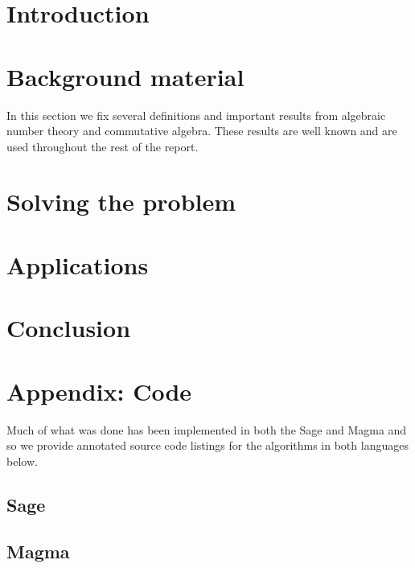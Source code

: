 \documentclass[11pt,a4paper]{report}
\theoremstyle{definition}
\begin{document}
\maketitle
\tableofcontents


\chapter{Introduction}

\chapter{Background material}
In this section we fix several definitions and important results from algebraic number theory and commutative algebra.
These results are well known and are used throughout the rest of the report.



\chapter{Solving the problem}


\chapter{Applications}


\chapter{Conclusion}


\chapter{Appendix: Code}

Much of what was done has been implemented in both the Sage and Magma and so we provide annotated source code listings for the algorithms in both languages below.
 
\section{Sage}


\section{Magma}


\nocite{*}


\end{document}
